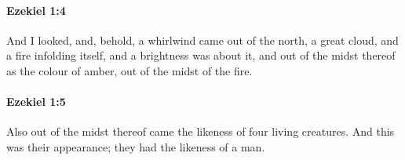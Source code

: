 		\paragraph{Ezekiel 1:4} %
			\label{EZEKIEL-1-4}

			And I looked, and, behold, a whirlwind came out of the north, a great cloud, and a fire infolding itself, and a brightness was about it, and out of the midst thereof as the colour of amber, out of the midst of the fire.


		\paragraph{Ezekiel 1:5} %
			\label{EZEKIEL-1-5}

			Also out of the midst thereof came the likeness of four living creatures. And this was their appearance; they had the likeness of a man.


